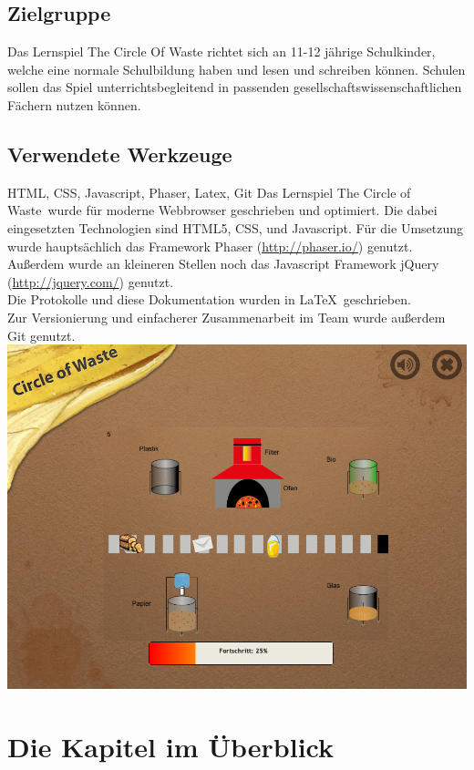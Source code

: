 \documentclass[a4paper]{article}
\begin{document}
\pagebreak

    \subsection{Zielgruppe}
        Das Lernspiel The Circle Of Waste richtet sich an 11-12 jährige Schulkinder, welche eine normale Schulbildung haben und lesen und schreiben können. Schulen sollen das Spiel unterrichtsbegleitend in passenden gesellschaftswissenschaftlichen Fächern nutzen können.

    \subsection{Verwendete Werkzeuge}
        HTML, CSS, Javascript, Phaser, Latex, Git
        Das Lernspiel \glqq The Circle of Waste\grqq\ wurde für moderne Webbrowser geschrieben und optimiert. Die dabei eingesetzten Technologien sind HTML5, CSS, und Javascript. Für die Umsetzung wurde hauptsächlich das Framework Phaser (\url{http://phaser.io/}) genutzt. Außerdem wurde an kleineren Stellen noch das Javascript Framework jQuery (\url{http://jquery.com/}) genutzt.\\
        Die Protokolle und diese Dokumentation wurden in \LaTeX\ geschrieben.\\
        Zur Versionierung und einfacherer Zusammenarbeit im Team wurde außerdem Git genutzt.\\

    \includegraphics[width=\linewidth]{kapitel4.png}

\pagebreak

\section{Die Kapitel im Überblick}
\end{document}
